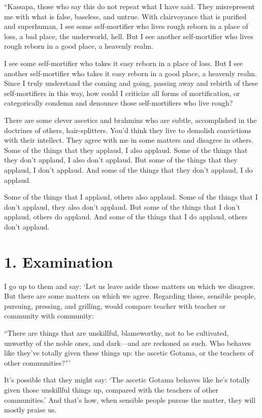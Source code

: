 \documentclass[12pt,openany]{book}%
\begin{document}
“Kassapa, those who say this do not repeat what I have said. They misrepresent me with what is false, baseless, and untrue. With clairvoyance that is purified and superhuman, I see some self-mortifier who lives rough reborn in a place of loss, a bad place, the underworld, hell. But I see another self-mortifier who lives rough reborn in a good place, a heavenly realm. 

I see some self-mortifier who takes it easy reborn in a place of loss. But I see another self-mortifier who takes it easy reborn in a good place, a heavenly realm. Since I truly understand the coming and going, passing away and rebirth of these self-mortifiers in this way, how could I criticize all forms of mortification, or categorically condemn and denounce those self-mortifiers who live rough? 

There are some clever ascetics and brahmins who are subtle, accomplished in the doctrines of others, hair-splitters. You’d think they live to demolish convictions with their intellect. They agree with me in some matters and disagree in others. Some of the things that they applaud, I also applaud. Some of the things that they don’t applaud, I also don’t applaud. But some of the things that they applaud, I don’t applaud. And some of the things that they don’t applaud, I do applaud. 

Some of the things that I applaud, others also applaud. Some of the things that I don’t applaud, they also don’t applaud. But some of the things that I don’t applaud, others do applaud. And some of the things that I do applaud, others don’t applaud. 

\section*{1. Examination }

I go up to them and say: ‘Let us leave aside those matters on which we disagree. But there are some matters on which we agree. Regarding these, sensible people, pursuing, pressing, and grilling, would compare teacher with teacher or community with community: 

“There are things that are unskillful, blameworthy, not to be cultivated, unworthy of the noble ones, and dark—and are reckoned as such. Who behaves like they’ve totally given these things up: the ascetic Gotama, or the teachers of other communities?”’ 

It’s possible that they might say: ‘The ascetic Gotama behaves like he’s totally given those unskillful things up, compared with the teachers of other communities.’ And that’s how, when sensible people pursue the matter, they will mostly praise us. 
\end{document}
